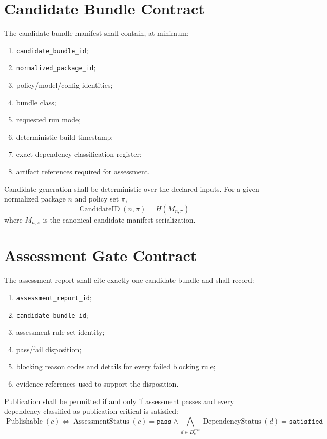 \documentclass[11pt]{report}
\begin{document}
\section{Candidate Bundle Contract}
The candidate bundle manifest shall contain, at minimum:
\begin{enumerate}[leftmargin=1.2cm]
    \item \texttt{candidate\_bundle\_id};
    \item \texttt{normalized\_package\_id};
    \item policy/model/config identities;
    \item bundle class;
    \item requested run mode;
    \item deterministic build timestamp;
    \item exact dependency classification register;
    \item artifact references required for assessment.
\end{enumerate}

Candidate generation shall be deterministic over the declared inputs. For a given normalized package \(n\) and policy set \(\pi\),
\[
\operatorname{CandidateID}(n,\pi)=H(M_{n,\pi})
\]
where \(M_{n,\pi}\) is the canonical candidate manifest serialization.

\section{Assessment Gate Contract}
The assessment report shall cite exactly one candidate bundle and shall record:
\begin{enumerate}[leftmargin=1.2cm]
    \item \texttt{assessment\_report\_id};
    \item \texttt{candidate\_bundle\_id};
    \item assessment rule-set identity;
    \item pass/fail disposition;
    \item blocking reason codes and details for every failed blocking rule;
    \item evidence references used to support the disposition.
\end{enumerate}

Publication shall be permitted if and only if assessment passes and every dependency classified as publication-critical is satisfied:
\[
\operatorname{Publishable}(c) \iff \operatorname{AssessmentStatus}(c)=\texttt{pass} \land \bigwedge_{d\in D_c^{crit}}\operatorname{DependencyStatus}(d)=\texttt{satisfied}
\]
\end{document}
